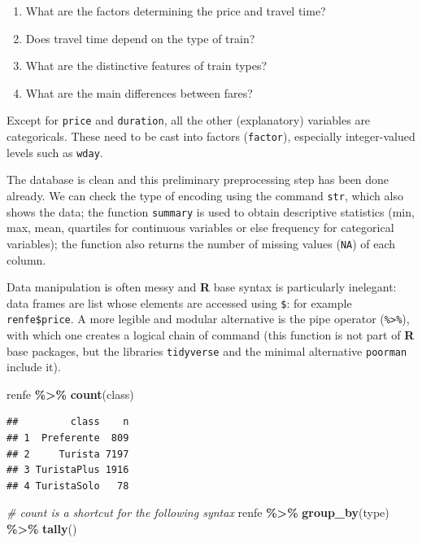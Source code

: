 \documentclass[
  11pt,
  letterpaper,
]{book}
\newenvironment{Shaded}{\begin{snugshade}}{\end{snugshade}}
\newcommand{\CommentTok}[1]{\textcolor[rgb]{0.56,0.35,0.01}{\textit{#1}}}
\newcommand{\KeywordTok}[1]{\textcolor[rgb]{0.13,0.29,0.53}{\textbf{#1}}}
\newcommand{\NormalTok}[1]{#1}
\newcommand{\OperatorTok}[1]{\textcolor[rgb]{0.81,0.36,0.00}{\textbf{#1}}}
\newcommand{\StringTok}[1]{\textcolor[rgb]{0.31,0.60,0.02}{#1}}
\providecommand{\tightlist}{%
  \setlength{\itemsep}{0pt}\setlength{\parskip}{0pt}}
\theoremstyle{definition}
\theoremstyle{definition}
\theoremstyle{definition}
\theoremstyle{remark}
\begin{document}
\begin{enumerate}
\def\labelenumi{\arabic{enumi}.}
\tightlist
\item
  What are the factors determining the price and travel time?
\item
  Does travel time depend on the type of train?
\item
  What are the distinctive features of train types?
\item
  What are the main differences between fares?
\end{enumerate}

Except for \texttt{price} and \texttt{duration}, all the other (explanatory) variables are categoricals. These need to be cast into factors (\texttt{factor}), especially integer-valued levels such as \texttt{wday}.

The database is clean and this preliminary preprocessing step has been done already. We can check the type of encoding using the command \texttt{str}, which also shows the data; the function \texttt{summary} is used to obtain descriptive statistics (min, max, mean, quartiles for continuous variables or else frequency for categorical variables); the function also returns the number of missing values (\texttt{NA}) of each column.

Data manipulation is often messy and \textbf{R} base syntax is particularly inelegant: data frames are list whose elements are accessed using \texttt{\$}: for example \texttt{renfe\$price}. A more legible and modular alternative is the pipe operator (\texttt{\%\textgreater{}\%}), with which one creates a logical chain of command (this function is not part of \textbf{R} base packages, but the libraries \texttt{tidyverse} and the minimal alternative \texttt{poorman} include it).

\begin{Shaded}
\begin{Highlighting}[]
\NormalTok{renfe }\OperatorTok{\%\textgreater{}\%}\StringTok{ }\KeywordTok{count}\NormalTok{(class)}
\end{Highlighting}
\end{Shaded}

\begin{verbatim}
##         class    n
## 1  Preferente  809
## 2     Turista 7197
## 3 TuristaPlus 1916
## 4 TuristaSolo   78
\end{verbatim}

\begin{Shaded}
\begin{Highlighting}[]
\CommentTok{\# \textasciigrave{}count\textasciigrave{} is a shortcut for the following syntax}
\NormalTok{renfe }\OperatorTok{\%\textgreater{}\%}\StringTok{ }\KeywordTok{group\_by}\NormalTok{(type) }\OperatorTok{\%\textgreater{}\%}\StringTok{ }\KeywordTok{tally}\NormalTok{()}
\end{Highlighting}
\end{Shaded}
\end{document}

